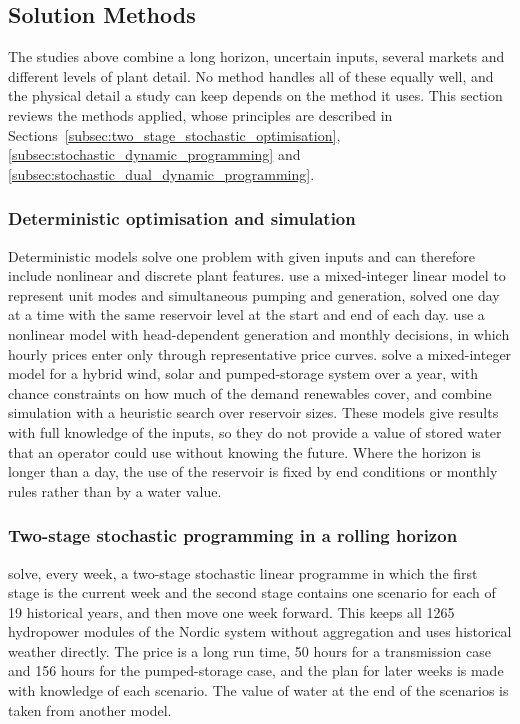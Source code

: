 \subsection{Solution Methods}
\label{sec:lit_methods}

The studies above combine a long horizon, uncertain inputs, several
markets and different levels of plant detail. No method handles all of
these equally well, and the physical detail a study can keep depends on
the method it uses. This section reviews the methods applied, whose
principles are described in Sections~\ref{subsec:two_stage_stochastic_optimisation},
\ref{subsec:stochastic_dynamic_programming} and
\ref{subsec:stochastic_dual_dynamic_programming}.

\subsubsection*{Deterministic optimisation and simulation}

Deterministic models solve one problem with given inputs and can
therefore include nonlinear and discrete plant features.
\citet{chazarra2017} use a mixed-integer linear model to represent unit
modes and simultaneous pumping and generation, solved one day at a time
with the same reservoir level at the start and end of each day.
\citet{ak2019quantifying} use a nonlinear model with head-dependent
generation and monthly decisions, in which hourly prices enter only
through representative price curves. \citet{naval2025optimization} solve
a mixed-integer model for a hybrid wind, solar and pumped-storage system
over a year, with chance constraints on how much of the demand renewables
cover, and \citet{zisos2023mixing} combine simulation with a heuristic
search over reservoir sizes. These models give results with full
knowledge of the inputs, so they do not provide a value of stored water
that an operator could use without knowing the future. Where the
horizon is longer than a day, the use of the reservoir is fixed by end
conditions or monthly rules rather than by a water value.

\subsubsection*{Two-stage stochastic programming in a rolling horizon}

\citet{helseth2017} solve, every week, a two-stage stochastic linear
programme in which the first stage is the current week and the second
stage contains one scenario for each of 19 historical years, and then
move one week forward. This keeps all 1265 hydropower modules of the
Nordic system without aggregation and uses historical weather directly.
The price is a long run time, 50 hours for a transmission case and
156 hours for the pumped-storage case, and the plan for later weeks is
made with knowledge of each scenario. The value of water at the end of
the scenarios is taken from another model.

